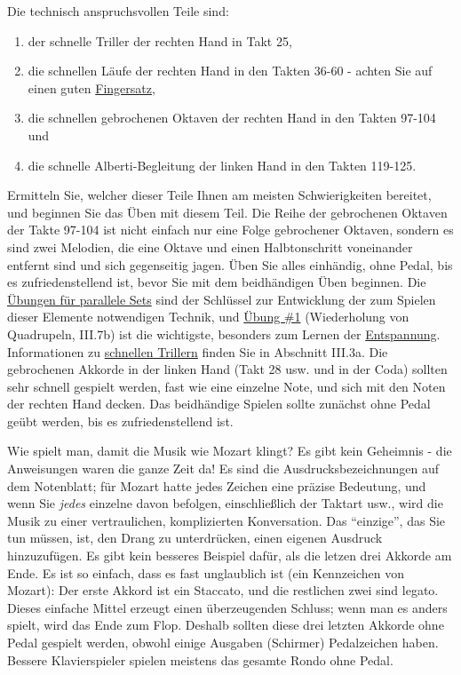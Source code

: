 Die technisch anspruchsvollen Teile sind:

\begin{enumerate}[label={\arabic*.}] 
 \item der schnelle Triller der rechten Hand in Takt 25,
 \item die schnellen Läufe der rechten Hand in den Takten 36-60 - achten Sie auf einen guten \hyperlink{c1ii18}{Fingersatz},
 \item die schnellen gebrochenen Oktaven der rechten Hand in den Takten 97-104 und 
 \item die schnelle Alberti-Begleitung der linken Hand in den Takten 119-125.
 \end{enumerate}

Ermitteln Sie, welcher dieser Teile Ihnen am meisten Schwierigkeiten bereitet, und beginnen Sie das Üben mit diesem Teil.
Die Reihe der gebrochenen Oktaven der Takte 97-104 ist nicht einfach nur eine Folge gebrochener Oktaven, sondern es sind zwei Melodien, die eine Oktave und einen Halbtonschritt voneinander entfernt sind und sich gegenseitig jagen.
Üben Sie alles einhändig, ohne Pedal, bis es zufriedenstellend ist, bevor Sie mit dem beidhändigen Üben beginnen.
Die \hyperlink{c1iii7b}{Übungen für parallele Sets} sind der Schlüssel zur Entwicklung der zum Spielen dieser Elemente notwendigen Technik, und \hyperlink{c1iii7b1}{Übung \#1} (Wiederholung von Quadrupeln, III.7b) ist die wichtigste, besonders zum Lernen der \hyperlink{c1ii14}{Entspannung}.
Informationen zu \hyperlink{c1iii3}{schnellen Trillern} finden Sie in Abschnitt III.3a.
Die gebrochenen Akkorde in der linken Hand (Takt 28 usw. und in der Coda) sollten sehr schnell gespielt werden, fast wie eine einzelne Note, und sich mit den Noten der rechten Hand decken.
Das beidhändige Spielen sollte zunächst ohne Pedal geübt werden, bis es zufriedenstellend ist.

Wie spielt man, damit die Musik wie Mozart klingt?
Es gibt kein Geheimnis - die Anweisungen waren die ganze Zeit da!
Es sind die Ausdrucksbezeichnungen auf dem Notenblatt; für Mozart hatte jedes Zeichen eine präzise Bedeutung, und wenn Sie \textit{jedes} einzelne davon befolgen, einschließlich der Taktart usw., wird die Musik zu einer vertraulichen, komplizierten Konversation.
Das \enquote{einzige}, das Sie tun müssen, ist, den Drang zu unterdrücken, einen eigenen Ausdruck hinzuzufügen.
Es gibt kein besseres Beispiel dafür, als die letzen drei Akkorde am Ende.
Es ist so einfach, dass es fast unglaublich ist (ein Kennzeichen von Mozart): Der erste Akkord ist ein Staccato, und die restlichen zwei sind legato.
Dieses einfache Mittel erzeugt einen überzeugenden Schluss; wenn man es anders spielt, wird das Ende zum Flop.
Deshalb sollten diese drei letzten Akkorde ohne Pedal gespielt werden, obwohl einige Ausgaben (Schirmer) Pedalzeichen haben.
Bessere Klavierspieler spielen meistens das gesamte Rondo ohne Pedal.

